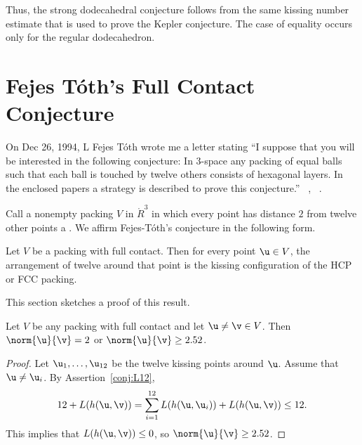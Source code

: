 Thus, the strong dodecahedral conjecture follows from the same kissing
number estimate that is used to prove the Kepler conjecture.  The case
of equality occurs only for the regular
dodecahedron.

\newpage
\section{Fejes T\'oth's Full Contact Conjecture}


On Dec 26, 1994, L Fejes T\'oth wrote me a letter stating ``I suppose that you will be
interested in the following conjecture: In $3$-space any packing of equal
balls such that each ball is touched by twelve others consists of hexagonal layers.
In the enclosed papers a strategy is described to prove this conjecture.''
~\cite{Fejes-Toth:89}, ~\cite{Fejes-Toth:69}.

Call a nonempty packing $ V$ in $\ring{R}^3$ in which every point has
distance  $2$ from twelve other points a .   We affirm Fejes-T\'oth's conjecture in the following form.
%
%
%


\begin{theorem}\label{thm:fc} 
  Let $ V$ be a packing with full contact.  Then for every point $
  \u\in V$, the arrangement of twelve around that point is the kissing
  configuration of the HCP or FCC packing.
\end{theorem}
%
%
%

This section  sketches a proof of this result.  


\begin{lemma}[] \label{lemma:gap}
  Let $V$ be any packing with full contact and let $\u\ne\v\in V$.
  Then $\norm{\u}{\v}=2$ or $\norm{\u}{\v} \ge 2.52$.
\end{lemma}
%
%

\begin{proof} Let $ \u_1,\ldots, \u_{12}$ be the twelve kissing points
  around $\u$.  Assume that $\u\ne \u_i$.  By
  Assertion~\ref{conj:L12},
\[
  12 + L(h( \u, \v)) 
  = \sum_{i=1}^{12} L(h( \u, \u_i)) + L(h( \u, \v)) \le 12.
\]
This implies that $L(h( \u, \v))\le 0$, so $\norm{ \u}{ \v}\ge 2.52$.
\end{proof}

